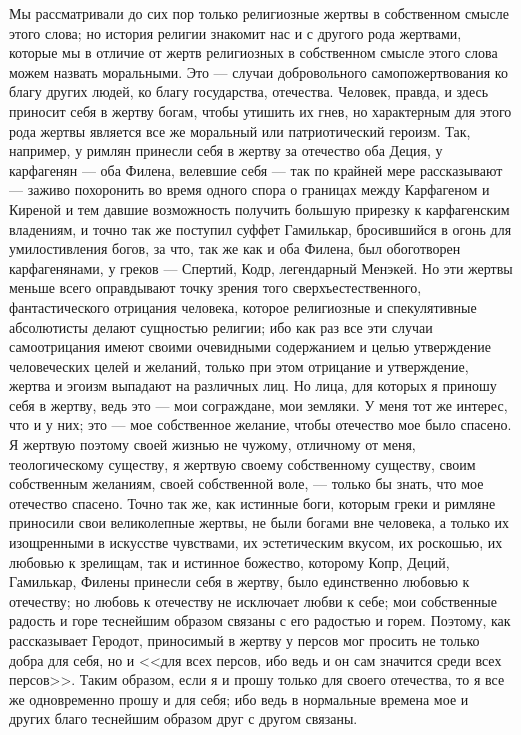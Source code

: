 \documentclass[12pt]{article}
\begin{document}
Мы рассматривали до сих пор только религиозные жертвы в собственном смысле этого слова; но история религии знакомит нас и с другого рода жертвами, которые мы в отличие от жертв религиозных в собственном смысле этого слова можем назвать моральными. Это --- случаи добровольного самопожертвования ко благу других людей, ко благу государства, отечества. Человек, правда, и здесь приносит себя в жертву богам, чтобы утишить их гнев, но характерным для этого рода жертвы является все же моральный или патриотический героизм. Так, например, у римлян принесли себя в жертву за отечество оба Деция, у карфагенян --- оба Филена, велевшие себя --- так по крайней мере рассказывают --- заживо похоронить во время одного спора о границах между Карфагеном и Киреной и тем давшие возможность получить большую прирезку к карфагенским владениям, и точно так же поступил суффет Гамилькар, бросившийся в огонь для умилостивления богов, за что, так же как и оба Филена, был обоготворен карфагенянами, у греков --- Спертий, Кодр, легендарный Менэкей. Но эти жертвы меньше всего оправдывают точку зрения того сверхъестественного, фантастического отрицания человека, которое религиозные и спекулятивные абсолютисты делают сущностью религии; ибо как раз все эти случаи самоотрицания имеют своими очевидными содержанием и целью утверждение человеческих целей и желаний, только при этом отрицание и утверждение, жертва и эгоизм выпадают на различных лиц. Но лица, для которых я приношу себя в жертву, ведь это --- мои сограждане, мои земляки. У меня тот же интерес, что и у них; это --- мое собственное желание, чтобы отечество мое было спасено. Я жертвую поэтому своей жизнью не чужому, отличному от меня, теологическому существу, я жертвую своему собственному существу, своим собственным желаниям, своей собственной воле, --- только бы знать, что мое отечество спасено. Точно так же, как истинные боги, которым греки и римляне приносили свои великолепные жертвы, не были богами вне человека, а только их изощренными в искусстве чувствами, их эстетическим вкусом, их роскошью, их любовью к зрелищам, так и истинное божество, которому Копр, Деций, Гамилькар, Филены принесли себя в жертву, было единственно любовью к отечеству; но любовь к отечеству не исключает любви к себе; мои собственные радость и горе теснейшим образом связаны с его радостью и горем. Поэтому, как рассказывает Геродот, приносимый в жертву у персов мог просить не только добра для себя, но и <<для всех персов, ибо ведь и он сам значится среди всех персов>>. Таким образом, если я и прошу только для своего отечества, то я все же одновременно прошу и для себя; ибо ведь в нормальные времена мое и других благо теснейшим образом друг с другом связаны. 
\end{document}
